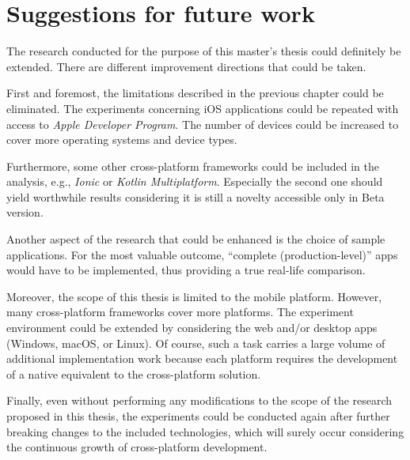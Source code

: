 \section{Suggestions for future work}

The research conducted for the purpose of this master's thesis could definitely be extended. There are different improvement directions that could be taken.

First and foremost, the limitations described in the previous chapter could be eliminated. The experiments concerning iOS applications could be repeated with access to \emph{Apple Developer Program}. The number of devices could be increased to cover more operating systems and device types.

Furthermore, some other cross-platform frameworks could be included in the analysis, e.g., \emph{Ionic} or \emph{Kotlin Multiplatform}. Especially the second one should yield worthwhile results considering it is still a novelty accessible only in Beta version.

Another aspect of the research that could be enhanced is the choice of sample applications. For the most valuable outcome, ``complete (production-level)'' apps would have to be implemented, thus providing a true real-life comparison.

Moreover, the scope of this thesis is limited to the mobile platform. However, many cross-platform frameworks cover more platforms. The experiment environment could be extended by considering the web and/or desktop apps (Windows, macOS, or Linux). Of course, such a task carries a large volume of additional implementation work because each platform requires the development of a native equivalent to the cross-platform solution.

Finally, even without performing any modifications to the scope of the research proposed in this thesis, the experiments could be conducted again after further breaking changes to the included technologies, which will surely occur considering the continuous growth of cross-platform development.
